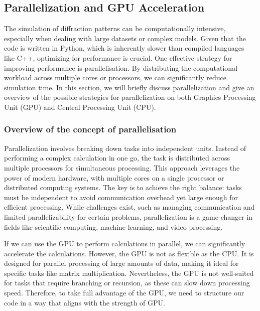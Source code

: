 \subsection{Parallelization and GPU Acceleration}

The simulation of diffraction patterns can be computationally intensive, especially when dealing with large datasets or complex models. 
Given that the code is written in Python, which is inherently slower than compiled languages like C++, optimizing for performance is crucial. 
One effective strategy for improving performance is parallelisation. By distributing the computational workload across multiple cores or processors, 
we can significantly reduce simulation time. In this section, we will briefly discuss parallelization and give an overview of the possible strategies for parallelization 
on both Graphics Processing Unit (GPU) and Central Processing Unit (CPU).


\medskip

\subsubsection{Overview of the concept of parallelisation}

Parallelization involves breaking down tasks into independent units. Instead of performing a complex calculation in one go, the task is 
distributed across multiple processors for simultaneous processing. This approach leverages the power of modern hardware, with multiple cores 
on a single processor or distributed computing systems. The key is to achieve the right balance: tasks must be independent to avoid communication 
overhead yet large enough for efficient processing. While challenges exist, such as managing communication and limited parallelizability for certain 
problems, parallelization is a game-changer in fields like scientific computing, machine learning, and video processing.

\medskip

If we can use the GPU to perform calculations in parallel, we can significantly accelerate the calculations. However, the GPU is not as 
flexible as the CPU. It is designed for parallel processing of large amounts of data, making it ideal for specific tasks like matrix multiplication. Nevertheless, 
the GPU is not well-suited for tasks that require branching or recursion, as these can slow down processing speed. Therefore, to take full advantage of 
the GPU, we need to structure our code in a way that aligns with the strength of GPU.

